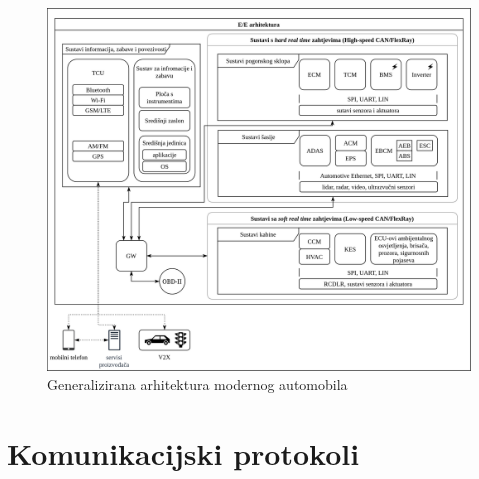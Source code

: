 \documentclass[times, utf8, diplomski, numeric]{fer}
\begin{document}
\begin{figure}[htb]
\centering
\includegraphics[width=\textwidth]{arhitektura.png}
\caption{Generalizirana arhitektura modernog automobila}
\label{fig:arhitektura}
\end{figure}
\newpage
\section{Komunikacijski protokoli}
\end{document}
